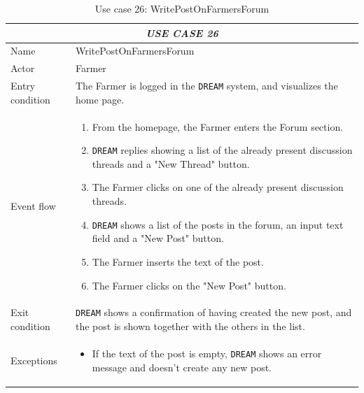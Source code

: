 \documentclass{article}
\begin{document}
\centering
\begin{longtable}{|p{3.5cm}|m{8cm}|}
\caption{Use case 26: WritePostOnFarmersForum}
 \label{uc26}
 \hline
 \multicolumn{2}{|c|}{\cellcolor{white}\emph{USE CASE 26}} \\
 \endfirsthead
 \endhead
 \endfoot
 \endlastfoot
 \hline
 Name & WritePostOnFarmersForum\\
 \hline
 Actor & Farmer\\
 \hline
 Entry condition & The Farmer is logged in the \verb|DREAM| system, and visualizes the home page.\\
 \hline
 Event flow & \begin{enumerate}
    \item From the homepage, the Farmer enters the Forum section.
    \item \verb|DREAM| replies showing a list of the already present discussion threads and a "New Thread" button.
    \item The Farmer clicks on one of the already present discussion threads.
    \item \verb|DREAM| shows a list of the posts in the forum, an input text field and a "New Post" button.
    \item The Farmer inserts the text of the post.
    \item The Farmer clicks on the "New Post" button.
 \end{enumerate}\\
 \hline
 Exit condition & \verb|DREAM| shows a confirmation of having created the new post, and the post is shown together with the others in the list.\\
 \hline
 Exceptions & \begin{itemize}
     \item If the text of the post is empty, \verb|DREAM| shows an error message and doesn't create any new post.
 \end{itemize}\\
 \hline
\end{longtable}
\end{document}
